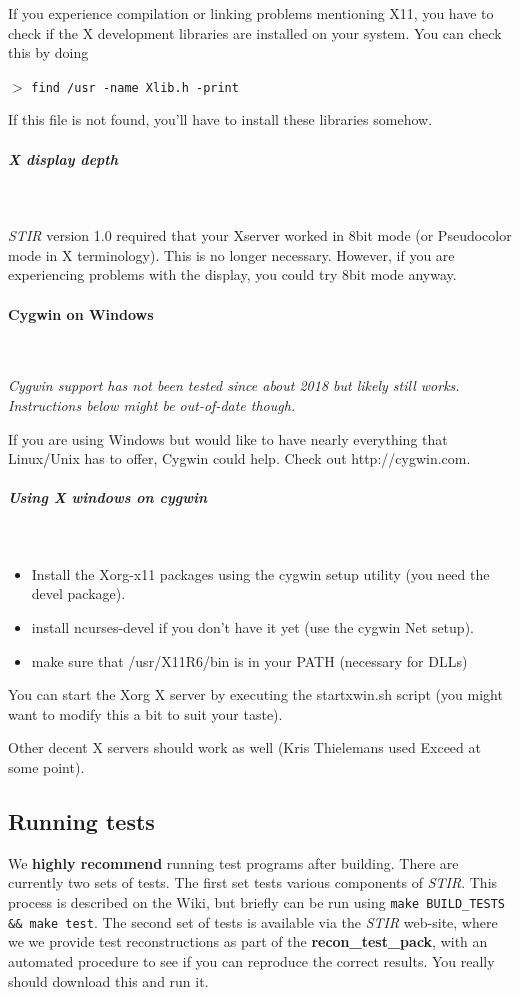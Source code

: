 \documentclass{article}
\newcommand{\subsubsubsection}[1]{\paragraph{#1}\mbox{} \\}
\newcommand{\subsubsubsubsection}[1]{\subparagraph{#1} \mbox{} \\}
\newcommand{\cmdline}[1]{\par \noindent $>$ \texttt{#1}\par}
\begin{document}
If you experience compilation 
or linking problems mentioning X11, you have to check if the 
X development libraries are installed on your system. You can 
check this by doing
\cmdline{find /usr -name Xlib.h -print}

If this file is not found, you'll have to install these libraries 
somehow.

{ \subsubsubsubsection{X display depth}
}

\textit{STIR} version 1.0 required that your Xserver worked in 8bit 
mode (or Pseudocolor mode in X terminology). This is no longer 
necessary. However, if you are experiencing problems with the 
display, you could try 8bit mode anyway.



{ \subsubsubsection{Cygwin on Windows}
}
\textit{Cygwin support has not been tested since about 2018 but likely still works. Instructions below might be out-of-date though.}

If you are using Windows but would like 
to have nearly everything that Linux/Unix has to offer, Cygwin could help. Check out http://cygwin.com.

{ \subsubsubsubsection{Using X windows on cygwin}
}
\begin{itemize}
\item Install the Xorg-x11 packages using the cygwin setup utility 
(you need the devel package).
\item 
install ncurses-devel if you don't have it yet (use the cygwin 
Net setup).
\item make sure that /usr/X11R6/bin is in your PATH (necessary 
for DLLs)
\end{itemize}

You can start the Xorg X server by executing the startxwin.sh 
script (you might want to modify this a bit to suit your taste). 

Other decent X servers should work as well (Kris Thielemans used Exceed at 
some point).


\subsection{
Running tests}

We \textbf{highly recommend} running test programs after building. There are currently two
sets of tests. The first set tests various components of
\textit{STIR}. This process is described on the Wiki, but briefly can
be run using \texttt{make BUILD\_TESTS \&\& make test}.
The second set of tests is available via the \textit{STIR} web-site, where we 
we provide test reconstructions as part of the
\textbf{recon\_test\_pack}, with an 
automated procedure to see if you can reproduce the correct results. 
You really should download this and run it.
\end{document}

